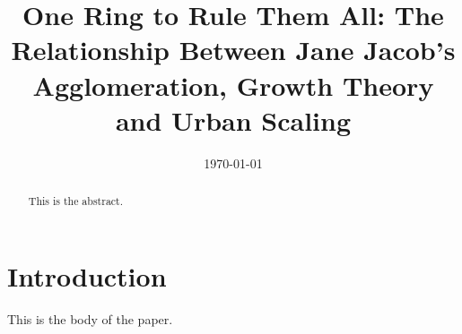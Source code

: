 \documentclass[a4paper]{article}
\title{One Ring to Rule Them All: The Relationship Between Jane Jacob's Agglomeration, Growth Theory and Urban Scaling}
\author{ }
\date{\today}
\theoremstyle{definition}
\theoremstyle{plain}
\begin{document}
\maketitle
\begin{abstract}
This is the abstract.
\end{abstract}

\section{Introduction}
This is the body of the paper.

\end{document}
